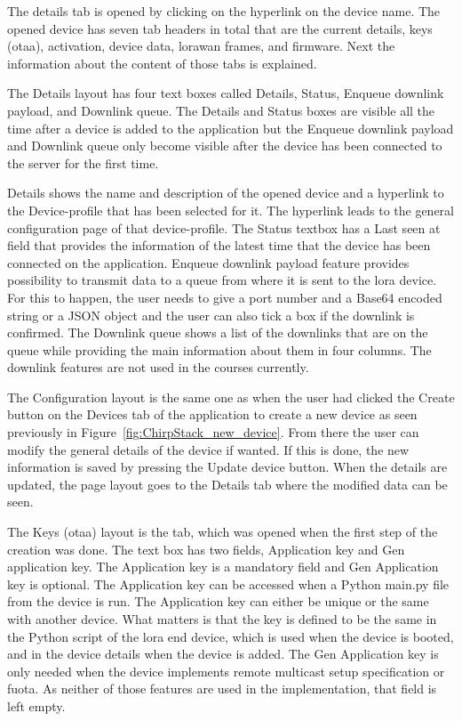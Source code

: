 The details tab is opened by clicking on the hyperlink on the device name.
The opened device has seven tab headers in total that are the current details, keys (\gls{otaa}), activation, device data, \gls{lorawan} frames, and firmware.
Next the information about the content of those tabs is explained.

The Details layout has four text boxes called Details, Status, Enqueue downlink payload, and Downlink queue.
The Details and Status boxes are visible all the time after a device is added to the application but the Enqueue downlink payload and Downlink queue only become visible after the device has been connected to the server for the first time.

Details shows the name and description of the opened device and a hyperlink to the Device-profile that has been selected for it.
The hyperlink leads to the general configuration page of that device-profile.
The Status textbox has a Last seen at field that provides the information of the latest time that the device has been connected on the application.
Enqueue downlink payload feature provides possibility to transmit data to a queue from where it is sent to the \gls{lora} device.
For this to happen, the user needs to give a port number and a Base64 encoded string or a JSON object and the user can also tick a box if the downlink is confirmed.
The Downlink queue shows  a list of the downlinks that are on the queue while providing the main information about them in four columns.
The downlink features are not used in the courses currently.

The Configuration layout is the same one as when the user had clicked the Create button on the Devices tab of the application to create a new device as seen previously in Figure~\ref{fig:ChirpStack_new_device}.
From there the user can modify the general details of the device if wanted.
If this is done, the new information is saved by pressing the Update device button.
When the details are updated, the page layout goes to the Details tab where the modified data can be seen.

The Keys (\gls{otaa}) layout is the tab, which was opened when the first step of the creation was done.
The text box has two fields, Application key and Gen application key.
The Application key is a mandatory field and Gen Application key is optional.
The Application key can be accessed when a Python main.py file from the device is run.
The Application key can either be unique or the same with another device.
What matters is that the key is defined to be the same in the Python script of the \gls{lora} end device, which is used when the device is booted, and in the device details when the device is added.
The Gen Application key is only needed when the device implements remote multicast setup specification or \gls{fuota}.
As neither of those features are used in the implementation, that field is left empty.

